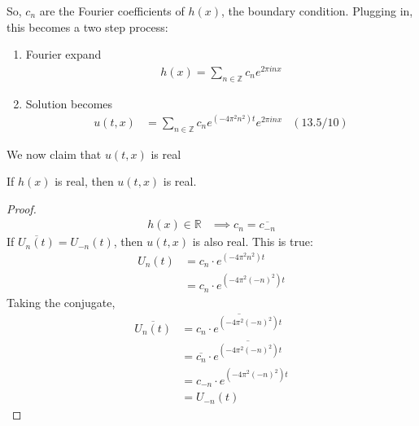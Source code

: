 So, $c_n$ are the Fourier coefficients of $h(x)$, the boundary condition. Plugging in, this becomes a two step process:
\begin{enumerate}
    \item Fourier expand
    \begin{align}
        h(x) = \sum_{n \in \mathbb{Z}} c_n e^{2\pi in x}
    \end{align}
    \item Solution becomes
    \begin{align}
        u(t, x) &= \sum_{n \in \mathbb{Z}} c_n e^{(-4\pi^2n^2)t} e^{2\pi in x} & (13.5/10)
    \end{align}
\end{enumerate}
We now claim that $u(t, x)$ is real
\begin{lemma}
    If $h(x)$ is real, then $u(t, x)$ is real.
\end{lemma}
\begin{proof}
    \begin{align}
        h(x) \in \mathbb{R} &\implies c_n = \overline{c_{-n}}
    \end{align}
    If $\overline{U_n(t)} = U_{-n}(t)$, then $u(t, x)$ is also real. This is true:
    \begin{align}
        U_n(t) &= c_n \cdot e^{(-4\pi^2n^2)t}\\
        &= c_n \cdot e^{(-4\pi^2(-n)^2)t}
    \end{align}
    Taking the conjugate,
    \begin{align}
        \overline{U_n(t)} &= \overline{c_n \cdot e^{(-4\pi^2(-n)^2)t}}\\
        &= \overline{c_n} \cdot \overline{e^{(-4\pi^2(-n)^2)t}}\\
        &= c_{-n} \cdot {e^{(-4\pi^2(-n)^2)t}}\\
        &= U_{-n}(t)
    \end{align}
\end{proof}

